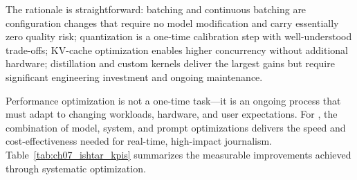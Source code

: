 \noindent The rationale is straightforward: batching and continuous batching are configuration changes that require no model modification and carry essentially zero quality risk; quantization is a one-time calibration step with well-understood trade-offs; KV-cache optimization enables higher concurrency without additional hardware; distillation and custom kernels deliver the largest gains but require significant engineering investment and ongoing maintenance.


Performance optimization is not a one-time task—it is an ongoing process that must adapt to changing workloads, hardware, and user expectations. For \ishtar{}, the combination of model, system, and prompt optimizations delivers the speed and cost-effectiveness needed for real-time, high-impact journalism. Table~\ref{tab:ch07_ishtar_kpis} summarizes the measurable improvements achieved through systematic optimization.

